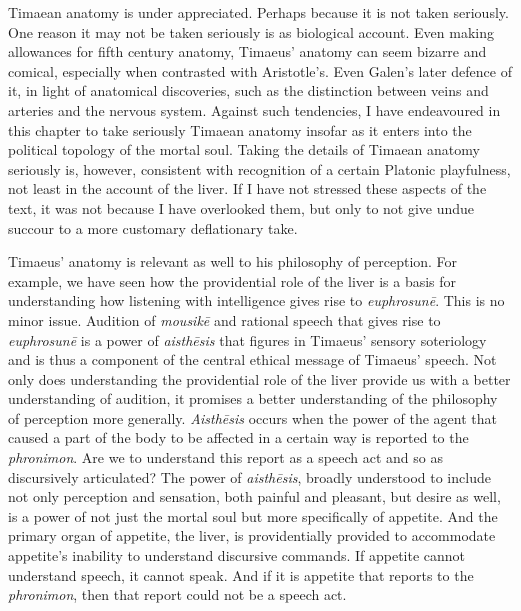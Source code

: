 Timaean anatomy is under appreciated. Perhaps because it is not taken seriously. One reason it may not be taken seriously is as biological account. Even making allowances for fifth century anatomy, Timaeus' anatomy can seem bizarre and comical, especially when contrasted with Aristotle's. Even Galen's later defence of it, in light of anatomical discoveries, such as the distinction between veins and arteries and the nervous system. Against such tendencies, I have endeavoured in this chapter to take seriously Timaean anatomy insofar as it enters into the political topology of the mortal soul. Taking the details of Timaean anatomy seriously is, however, consistent with recognition of a certain Platonic playfulness, not least in the account of the liver. If I have not stressed these aspects of the text, it was not because I have overlooked them, but only to not give undue succour to a more customary deflationary take.

Timaeus' anatomy is relevant as well to his philosophy of perception. For example, we have seen how the providential role of the liver is a basis for understanding how listening with intelligence gives rise to \emph{euphrosunē}. This is no minor issue. Audition of \emph{mousikē} and rational speech that gives rise to \emph{euphrosunē} is a power of \emph{aisthēsis} that figures in Timaeus' sensory soteriology and is thus a component of the central ethical message of Timaeus' speech. Not only does understanding the providential role of the liver provide us with a better understanding of audition, it promises a better understanding of the philosophy of perception more generally. \emph{Aisthēsis} occurs when the power of the agent that caused a part of the body to be affected in a certain way is reported to the \emph{phronimon}. Are we to understand this report as a speech act and so as discursively articulated? The power of \emph{aisthēsis}, broadly understood to include not only perception and sensation, both painful and pleasant, but desire as well, is a power of not just the mortal soul but more specifically of appetite. And the primary organ of appetite, the liver, is providentially provided to accommodate appetite's inability to understand discursive commands. If appetite cannot understand speech, it cannot speak. And if it is appetite that reports to the \emph{phronimon}, then that report could not be a speech act.



